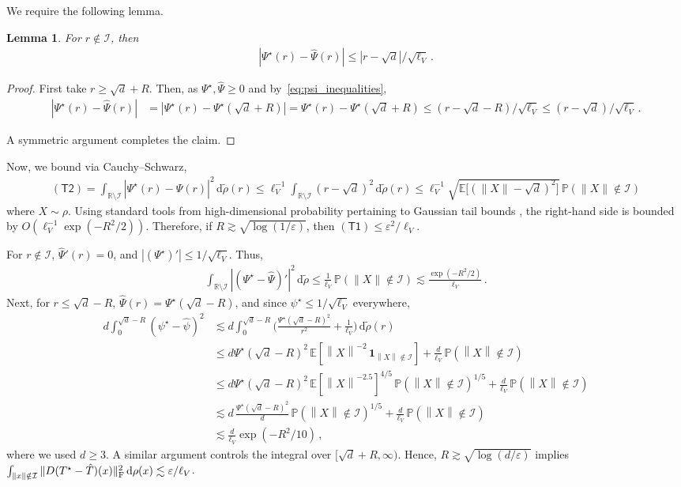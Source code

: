\documentclass[twoside]{article}
\newcommand{\cI}{\mathcal{I}}
\newcommand{\1}{\mathds{1}}
\newcommand*{\norm}[1]{\left\|#1\right\|}
\newcommand{\R}{\mathbb{R}}
\newcommand{\eps}{\varepsilon}
\renewcommand{\epsilon}{\varepsilon}
\newcommand*{\E}{\mathbb E}
\newcommand*{\rd}{\mathrm{d}}
\newcommand*{\dd}{\, \rd}
\theoremstyle{plain}
\newtheorem{lemma}[theorem]{Lemma}
\theoremstyle{definition}
\theoremstyle{remark}
\renewcommand{\tilde}{\widetilde}
\begin{document}
We require the following lemma.
\begin{lemma}\label{lem:helper_lemma}
For $r \notin \cI$, then
\begin{align*}
    |\Psi^\star(r) - \hat\Psi(r)| \leq |r-\sqrt d|/\sqrt{\ell_V}\,.
\end{align*}
\end{lemma}
\begin{proof}
First take $r \geq \sqrt{d} + R$. Then, as $\Psi^\star, \hat\Psi \geq 0$ and by~\eqref{eq:psi_inequalities},
\begin{align*}
    |\Psi^\star(r) - \hat\Psi(r)|
    &= |\Psi^\star(r) - \Psi^\star(\sqrt d + R)|
    = \Psi^\star(r) - \Psi^\star(\sqrt d + R)
    \le (r-\sqrt d - R)/\sqrt{\ell_V}
    \le (r-\sqrt d)/\sqrt{\ell_V}\,.
\end{align*}

A symmetric argument completes the claim.
\end{proof}
Now, we bound via Cauchy--Schwarz,
\begin{align*}
    (\mathsf{T2}) = \int_{\R\setminus \cI}|\Psi^\star(r) - \hat\Psi(r)|^2\dd\tilde\rho(r) \leq \ell_V^{-1}\int_{\R\setminus\cI} (r-\sqrt d)^2 \dd\tilde\rho(r) \leq \ell_V^{-1} \sqrt{\E\bigl[(\|X\|-\sqrt d)^2\bigr]}\,\mathbb{P}(\|X\|\notin \cI)
\end{align*}
where $X\sim\rho$. Using standard tools from high-dimensional probability pertaining to Gaussian tail bounds \citep{van2014probability}, the right-hand side is bounded by $O(\ell_V^{-1}\exp(-R^2/2))$.
Therefore, if $R\gtrsim \sqrt{\log(1/\epsilon)}$, then $(\mathsf{T1}) \leq \epsilon^2/\ell_V$.

For $r \notin \cI$, $\hat\Psi'(r) = 0$, and $|(\Psi^\star)'| \le 1/\sqrt{\ell_V}$.
Thus,
\begin{align*}
    \int_{\R\setminus \cI} |(\Psi^\star - \hat\Psi)'|^2\dd\tilde\rho
    \le \frac{1}{\ell_V}\,\mathbb P(\|X\| \notin \cI)
    \lesssim \frac{\exp(-R^2/2)}{\ell_V}\,.
\end{align*}
Next, for $r \le \sqrt d - R$, {$\hat\Psi(r) = \Psi^\star(\sqrt d - R)$, and since $\psi^\star \le 1/\sqrt{\ell_V}$ everywhere,
\begin{align*}
    d\int_0^{\sqrt d - R} (\psi^\star-\hat\psi)^2
    &\lesssim d\int_0^{\sqrt d -R} \bigl(\frac{\Psi^\star(\sqrt d - R)^2}{r^2} + \frac{1}{\ell_V}\bigr)\dd \tilde \rho(r) \\
    &\le d\Psi^\star(\sqrt d - R)^2\, \E[\norm X^{-2}\,\mathbf 1_{\norm X \notin \cI}] + \frac{d}{\ell_V}\,\mathbb P(\norm X \notin \cI) \\
    &\le d\Psi^\star(\sqrt d - R)^2\,\E[\norm X^{-2.5}]^{4/5}\,\mathbb P(\norm X \notin \cI)^{1/5} + \frac{d}{\ell_V}\,\mathbb P(\norm X \notin \cI) \\
    &\lesssim d\, \frac{\Psi^\star(\sqrt d - R)^2}{d}\,\mathbb P(\norm X \notin \cI)^{1/5} + \frac{d}{\ell_V}\,\mathbb P(\norm X \notin \cI) \\
    &\lesssim \frac{d}{\ell_V} \exp(-R^2/10)\,,
\end{align*}
where we used $d \ge 3$.
A similar argument controls the integral over $[\sqrt d + R,\infty)$.
}
Hence, $R \gtrsim\sqrt{\log(d/\eps)}$ implies $\int_{\|x\|\notin \cI} \| D(T^\star - \hat T)(x)\|_{\rm F}^2\dd \rho(x) \lesssim \epsilon/\ell_V$.
\end{document}
